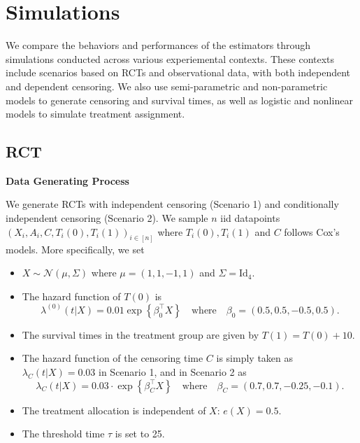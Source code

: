 \documentclass[
  11pt,
  a4paper,
]{article}
\providecommand{\tightlist}{%
  \setlength{\itemsep}{0pt}\setlength{\parskip}{0pt}}\usepackage{longtable,booktabs,array}
\theoremstyle{plain}
\theoremstyle{plain}
\theoremstyle{plain}
\theoremstyle{definition}
\theoremstyle{remark}
\begin{document}
\section{Simulations}\label{sec-simulation}

We compare the behaviors and performances of the estimators through
simulations conducted across various experiemental contexts. These
contexts include scenarios based on RCTs and observational data, with
both independent and dependent censoring. We also use semi-parametric
and non-parametric models to generate censoring and survival times, as
well as logistic and nonlinear models to simulate treatment assignment.

\subsection{RCT}\label{sec-simulation-RCT}

\textbf{Data Generating Process}

We generate RCTs with independent censoring (Scenario 1) and
conditionally independent censoring (Scenario 2). We sample \(n\) iid
datapoints \((X_{i},A_{i},C,T_{i}(0), T_{i}(1))_{i \in [n]}\) where
\(T_{i}(0), T_{i}(1)\) and \(C\) follows Cox's models. More
specifically, we set

\begin{itemize}
\item
  \(X \sim \mathcal{N}\left(\mu,\Sigma\right)\) where
  \(\mu = (1,1,-1,1)\) and \(\Sigma = \mathrm{Id}_4\).
\item
  The hazard function of \(T(0)\) is
  \[\lambda^{(0)}(t|X)= 0.01  \exp \left\{ \beta_0^\top X\right\} \quad \text{where} \quad \beta_0 = (0.5,0.5,-0.5,0.5).
  \]
\item
  The survival times in the treatment group are given by
  \(T(1) = T(0) + 10\).
\item
  The hazard function of the censoring time \(C\) is simply taken as
  \(\lambda_C(t|X)=0.03\) in Scenario 1, and in Scenario 2 as
  \[\lambda_C(t|X)=0.03 \cdot \exp \left\{\beta_C^\top X\right\} \quad \text{where} \quad \beta_C = (0.7,0.7,-0.25,-0.1).\]
\item
  The treatment allocation is independent of \(X\): \(e(X)=0.5\).
\end{itemize}

\begin{itemize}
\tightlist
\item
  The threshold time \(\tau\) is set to 25.
\end{itemize}
\end{document}
